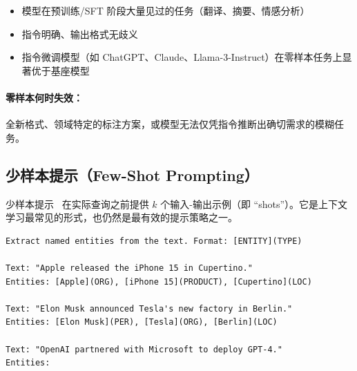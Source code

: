 \begin{itemize}
  \item 模型在预训练/SFT 阶段大量见过的任务（翻译、摘要、情感分析）
  \item 指令明确、输出格式无歧义
  \item 指令微调模型（如 ChatGPT、Claude、Llama-3-Instruct）在零样本任务上显著优于基座模型~\cite{ouyang2022training}
\end{itemize}

\paragraph{零样本何时失效：}
\label{when-zero-shot-fails}

全新格式、领域特定的标注方案，或模型无法仅凭指令推断出确切需求的模糊任务。

\subsection{少样本提示（Few-Shot Prompting）}
\label{few-shot-prompting}

少样本提示~\cite{brown2020language} 在实际查询之前提供 $k$ 个输入-输出示例（即 ``shots''）。它是上下文学习最常见的形式，也仍然是最有效的提示策略之一。

\begin{examplebox}[少样本命名实体识别]
\begin{lstlisting}
Extract named entities from the text. Format: [ENTITY](TYPE)

Text: "Apple released the iPhone 15 in Cupertino."
Entities: [Apple](ORG), [iPhone 15](PRODUCT), [Cupertino](LOC)

Text: "Elon Musk announced Tesla's new factory in Berlin."
Entities: [Elon Musk](PER), [Tesla](ORG), [Berlin](LOC)

Text: "OpenAI partnered with Microsoft to deploy GPT-4."
Entities:
\end{lstlisting}
\end{examplebox}


